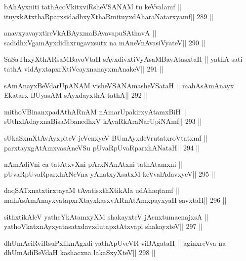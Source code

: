 \begin{shl}
bAhAyxniti tathAcoVkitxviRsheVSANAM tu keVvalamf ||
ituyxkAtxthaRparxsidadhxyXthaRmituyxdAharaNatarxyamf\hfill || 289 ||
\end{shl}

\begin{shl}
anavxyavayxtireVkABAyxmaBAvavapuSA\s thavA ||
sadidhxVgamAyxdidhxrugavxsutx na mAneVnAvasiVyateV\hfill || 290 ||
\end{shl}

\begin{shl}
SaSaThxyXthARsaMBavoV\s taH sAyxdivxtiVyAsaMBavAtasxtaH ||
yathA sati tathA vidAyxtapxrXtiVcayxnanayxmAnakeV\hfill || 291 ||
\end{shl}

\begin{shl}
sAmAnayxBeVdarUpANAM visheVSANAmasheVSataH ||
mahAsAmAnayx Ekatarx BUyasAM sAyxdayxthA tathA\hfill || 292 ||
\end{shl}

\begin{shl}
mithoVBinanxpadAthARnAM nAmarUpakirxyAtamxBiH ||
sUthxlAdayxnaBisaMbanedhxV kAyaRkAraNarUpiNAmf\hfill || 293 ||
\end{shl}

\begin{shl}
sUkaSxmXtAvAyxpiteV jeVcnxyeV BUmAyxdeVrutatxroVtatxmf ||
parxtayxgAtAmxvasAneVSu pUvaRpUvaRparxhANataH\hfill || 294 ||
\end{shl}

\begin{shl}
nAmAdiVni ca tatAtxvXni pArxNAnAtxni tathA\s\s tamxni ||
pUvaRpUvaRparxhANeVna yAnatxyXsatxM keVvalAdavxyeV\hfill || 295 ||
\end{shl}

\begin{shl}
daqSATxnatxtirxtayaM tAvatisxthXtikAla udAhaqtamf ||
mahAsAmAnayxvatapxrXtayxkasxvARnAtAmxpayxyaH savxtaH\hfill || 296 ||
\end{shl}

\begin{shl}
sithxtikAleV yatheYkAtamxyXM shakayxteV jAcnxtumacnajxsA ||
yathoVkatxnAyxyatasatxdavxdutapxtAtxvapi shakayxteV\hfill || 297 ||
\end{shl}

\begin{shl}
dhUmAciRviRsuPxliknAgxdi yathApUveVR viBAgataH ||
aginxreVva na dhUmAdiBeVdaH kashacxna lakaSxyXteV\hfill || 298 ||
\end{shl}

